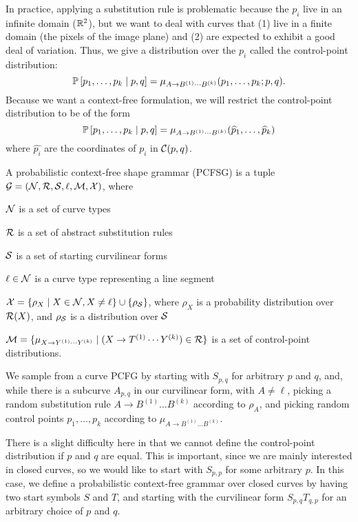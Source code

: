 \documentclass{article}
\begin{document}
In practice, applying a substitution rule is problematic because the
$p_i$ live in an infinite domain ($\mathbb{R}^2$), but we want to deal with
curves that (1) live in a finite domain (the pixels of the image
plane) and (2) are expected to exhibit a good deal of variation. Thus,
we give a distribution over the $p_i$ called the control-point
distribution:
$$ \mathbb{P} \left[ p_1,\dots, p_k \mid p,q \right] = \mu_{A\to
  B^{(1)}\cdots B^{(k)}}(p_1,\dots, p_k ; p,q).$$ Because we want a
context-free formulation, we will restrict the control-point
distribution to be of the form
$$ \mathbb{P} \left[ p_1,\dots, p_k \mid p,q \right] = \mu_{A\to
  B^{(1)}\cdots B^{(k)}}( \widehat{p}_1, \dots, \widehat{p}_k)$$ where
$\widehat{p_i}$ are the coordinates of $p_i$ in ${\mathcal C}(p,q)$.

\begin{defn}
A probabilistic context-free shape grammar (PCFSG) is a tuple 
${\mathcal G} = ({\mathcal N}, {\mathcal R}, {\mathcal S}, \ell, {\mathcal M}, {\mathcal X})$, where
\bitem
\item ${\mathcal N}$ is a set of curve types
\item ${\mathcal R}$ is a set of abstract substitution rules
\item ${\mathcal S}$ is a set of starting curvilinear forms
\item $\ell \in {\mathcal N}$ is a curve type representing a line segment
\item ${\mathcal X} = \{\rho_X \mid X\in {\mathcal N}, X\ne \ell\} \cup
  \{\rho_{\mathcal S}\}$, where $\rho_X$ is a probability distribution over
  ${\mathcal R}(X)$, and $\rho_{\mathcal S}$ is a distribution over ${\mathcal S}$
\item ${\mathcal M} = \{ \mu_{X\to Y^{(1)}\cdots Y^{(k)}} \mid (X\to
  T^{(1)}\cdots Y^{(k)}) \in {\mathcal R}\}$ is a set of control-point
  distributions.
\eitem
\end{defn}

We sample from a curve PCFG by starting with $S_{p,q}$ for arbitrary
$p$ and $q$, and, while there is a subcurve $A_{p,q}$ in our
curvilinear form, with $A\ne \ell$, picking a random substitution rule
$A \to B^{(1)} \dots B^{(k)}$ according to $\rho_A$, and picking
random control points $p_1,\dots, p_k$ according to $\mu_{A\to
  B^{(1)}\dots B^{(k)}}$.

There is a slight difficulty here in that we cannot define the
control-point distribution if $p$ and $q$ are equal. This is
important, since we are mainly interested in closed curves, so we
would like to start with $S_{p,p}$ for some arbitrary $p$. In this
case, we define a probabilistic context-free grammar over closed
curves by having two start symbols $S$ and $T$, and starting with the
curvilinear form $S_{p,q} T_{q,p}$ for an arbitrary choice of $p$ and
$q$.
\end{document}

